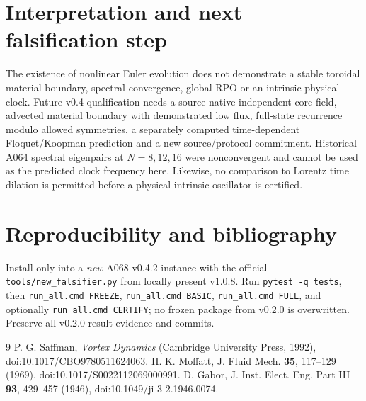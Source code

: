 \documentclass[11pt,a4paper]{article}
\begin{document}
\section{Interpretation and next falsification step}
The existence of nonlinear Euler evolution does not demonstrate a stable toroidal material boundary, spectral convergence, global RPO or an intrinsic physical clock. Future v0.4 qualification needs a source-native independent core field, advected material boundary with demonstrated low flux, full-state recurrence modulo allowed symmetries, a separately computed time-dependent Floquet/Koopman prediction and a new source/protocol commitment. Historical A064 spectral eigenpairs at $N=8,12,16$ were nonconvergent and cannot be used as the predicted clock frequency here. Likewise, no comparison to Lorentz time dilation is permitted before a physical intrinsic oscillator is certified.

\section{Reproducibility and bibliography}
Install only into a \emph{new} A068-v0.4.2 instance with the official \texttt{tools/new\_falsifier.py} from locally present v1.0.8. Run \texttt{pytest -q tests}, then \texttt{run\_all.cmd FREEZE}, \texttt{run\_all.cmd BASIC}, \texttt{run\_all.cmd FULL}, and optionally \texttt{run\_all.cmd CERTIFY}; no frozen package from v0.2.0 is overwritten. Preserve all v0.2.0 result evidence and commits.\par
\begin{thebibliography}{9}
 P. G. Saffman, \emph{Vortex Dynamics} (Cambridge University Press, 1992), doi:10.1017/CBO9780511624063.
 H. K. Moffatt, J. Fluid Mech. \textbf{35}, 117--129 (1969), doi:10.1017/S0022112069000991.
 D. Gabor, J. Inst. Elect. Eng. Part III \textbf{93}, 429--457 (1946), doi:10.1049/ji-3-2.1946.0074.
\end{thebibliography}
\end{document}
